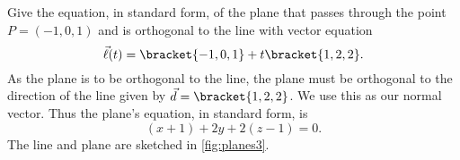 \begin{example}\label{ex_planes3}
Give the equation, in standard form, of the plane that passes through the point $P=(-1,0,1)$ and is orthogonal to the line with vector equation
\[\vec \ell(t) =\bracket{-1,0,1}+ t\bracket{1,2,2}.\]
\solution
As the plane is to be orthogonal to the line, the plane must be orthogonal to the direction of the line given by $\vec d =\bracket{1,2,2}$. We use this as our normal vector. Thus the plane's equation, in standard form, is
\[(x+1) +2y+2(z-1)=0.\]
The line and plane are sketched in \autoref{fig:planes3}.
\end{example}

